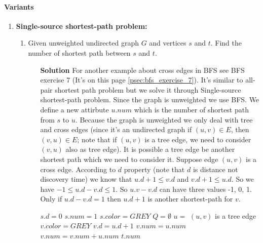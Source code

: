 \documentclass{book}
\begin{document}
	\label{psec:ShortestPathClassification}	
	\paragraph{Variants}
	\begin{enumerate}
	\item \textbf{Single-source shortest-path problem:}
	\begin{enumerate}
		\item Given unweighted undirected graph $G$ and vertices $s$ and $t$. Find the number of shortest path between $s$ and $t$.
		\begin{itemize}
			\item[\textbf{Solution}] For another example about cross edges in BFS see BFS exercise 7 (It's on this page \ref{psec:bfs_exercise_7}). It's similar to all-pair shortest path problem but we solve it through Single-source shortest-path problem. Since the graph is unweighted we use BFS. We define a new attirbute $u.num$ which is the number of shortest path from $s$ to $u$. Because the graph is unweighted we only deal with tree and cross edges (since it's an undirected graph if $(u, v) \in E$, then $(v, u) \in E$; note that if $(u, v)$ is a tree edge, we need to consider $(v, u)$ also as tree edge). It is possible a tree edge be another shortest path which we need to consider it. Suppose edge $(u, v)$ is a cross edge. According to $d$ property (note that $d$ is distance not discovery time) we know that $u.d + 1 \le v.d$ and $v.d + 1 \le u.d$. So we have $-1 \le u.d - v.d \le 1$. So $u.v - v.d$ can have three values -1, 0, 1. Only if $u.d - v.d = 1$ then $u.d + 1$ is another shortest-path for $v$.
			\begin{algorithm*}[h!]
				\begin{algorithmic}[1]
						\State \Call{INIT-BFS}{G}
						\State $s.d = 0$
						\State $s.num = 1$
						\State $s.color = GREY$
						\State $Q = \emptyset$						
						\State {}
							\State $u = $ 
								 \Comment $(u, v)$ is a tree edge
									\State $v.color = GREY$
									\State $v.d = u.d + 1$
									\State $v.num = u.num$
									\State {}
									\State $v.num = v.num + u.num$
								\EndIf
							\EndFor
						\EndWhile
						\State \Return $t.num$
					\EndFunction
				\end{algorithmic}

\end{algorithm*}
\end{itemize}
\end{enumerate}
\end{enumerate}
\end{document}
